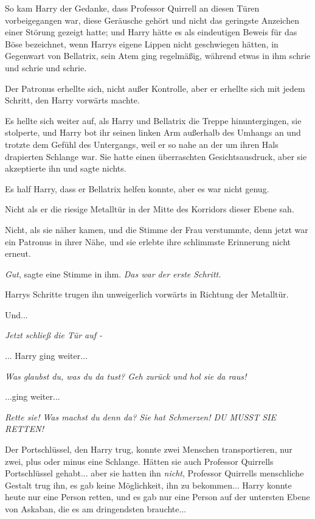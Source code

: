 {So kam Harry der Gedanke, dass Professor Quirrell an diesen Türen vorbeigegangen war, diese Geräusche gehört und nicht das geringste Anzeichen einer Störung gezeigt hatte; und Harry hätte es als eindeutigen Beweis für das Böse bezeichnet, wenn Harrys eigene Lippen nicht geschwiegen hätten, in Gegenwart von Bellatrix, sein Atem ging regelmäßig, während etwas in ihm schrie und schrie und schrie.

Der Patronus erhellte sich, nicht außer Kontrolle, aber er erhellte sich mit jedem Schritt, den Harry vorwärts machte.

Es hellte sich weiter auf, als Harry und Bellatrix die Treppe hinuntergingen, sie stolperte, und Harry bot ihr seinen linken Arm außerhalb des Umhangs an und trotzte dem Gefühl des Untergangs, weil er so nahe an der um ihren Hals drapierten Schlange war. Sie hatte einen überraschten Gesichtsausdruck, aber sie akzeptierte ihn und sagte nichts.

Es half Harry, dass er Bellatrix helfen konnte, aber es war nicht genug.

Nicht als er die riesige Metalltür in der Mitte des Korridors dieser Ebene sah.

Nicht, als sie näher kamen, und die Stimme der Frau verstummte, denn jetzt war ein Patronus in ihrer Nähe, und sie erlebte ihre schlimmste Erinnerung nicht erneut.

\emph{Gut}, sagte eine Stimme in ihm. \emph{Das war der erste Schritt.}

Harrys Schritte trugen ihn unweigerlich vorwärts in Richtung der Metalltür.

Und...

\emph{\emph{Jetzt schließ die Tür auf -}}

... Harry ging weiter...

\emph{\emph{Was glaubst du, was du da tust? Geh zurück und hol sie da raus!}}

...ging weiter...

\emph{\emph{Rette sie! Was machst du denn da? Sie hat Schmerzen! DU MUSST SIE RETTEN!}}

Der Portschlüssel, den Harry trug, konnte zwei Menschen transportieren, nur zwei, plus oder minus eine Schlange. Hätten sie auch Professor Quirrells Portschlüssel gehabt... aber sie hatten ihn \emph{nicht}, Professor Quirrells menschliche Gestalt trug ihn, es gab keine Möglichkeit, ihn zu bekommen... Harry konnte heute nur eine Person retten, und es gab nur eine Person auf der untersten Ebene von Askaban, die es am dringendsten brauchte...

}
